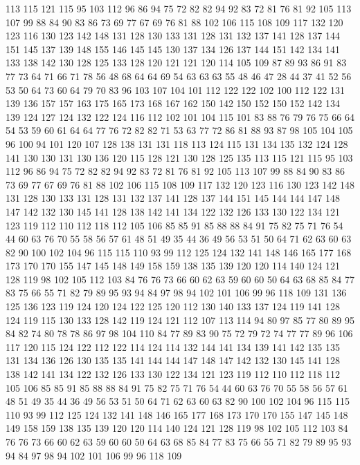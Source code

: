 113 115 121 115 95 103 112 96 86 94 75 72 82 82 94 92 83 72 81 76
81 92 105 113 107 99 88 84 90 83 86 73 69 77 67 69 76 81 88 102
106 115 108 109 117 132 120 123 116 130 123 142 148 131 128 130 133 131 128 131
132 137 141 128 137 144 151 145 137 139 148 155 146 145 145 130 137 134 126 137
144 151 142 134 141 133 138 142 130 128 125 133 128 120 121 121 120 114 105 109
87 89 93 86 91 83 77 73 64 71 66 71 78 56 48 68 64 64 69 54
63 63 63 55 48 46 47 28 44 37 41 52 56 53 50 64 73 60 64 79
70 83 96 103 107 104 101 112 122 122 102 100 112 122 131 139 136 157 157 163
175 165 173 168 167 162 150 142 150 152 150 152 142 134 139 124 127 124 132 122
124 116 112 102 101 104 115 101 83 88 76 79 76 75 66 64 54 53 59 60
61 64 64 77 76 72 82 82 71 53 63 77 72 86 81 88 93 87 98 105
104 105 96 100 94 101 120 107 128 138 131 131 118 113 124 115 131 134 135 132
124 128 141 130 130 131 130 136 120 115 128 121 130 128 125 135 113 115 121 115
95 103 112 96 86 94 75 72 82 82 94 92 83 72 81 76 81 92 105 113
107 99 88 84 90 83 86 73 69 77 67 69 76 81 88 102 106 115 108 109
117 132 120 123 116 130 123 142 148 131 128 130 133 131 128 131 132 137 141 128
137 144 151 145 144 144 147 148 147 142 132 130 145 141 128 138 142 141 134 122
132 126 133 130 122 134 121 123 119 112 110 112 118 112 105 106 85 85 91 85
88 88 84 91 75 82 75 71 76 54 44 60 63 76 70 55 58 56 57 61
48 51 49 35 44 36 49 56 53 51 50 64 71 62 63 60 63 82 90 100
102 104 96 115 115 110 93 99 112 125 124 132 141 148 146 165 177 168 173 170
170 155 147 145 148 149 158 159 138 135 139 120 120 114 140 124 121 128 119 98
102 105 112 103 84 76 76 73 66 60 62 63 59 60 60 50 64 63 68 85
84 77 83 75 66 55 71 82 79 89 95 93 94 84 97 98 94 102 101 106
99 96 118 109 131 136 125 136 123 119 124 120 124 122 125 120 112 130 140 133
137 124 119 141 128 124 119 115 130 133 128 142 119 124 121 112 107 113 114 94
80 97 85 77 80 89 95 84 82 74 80 78 78 86 97 98 104 110 84 77
89 83 90 75 72 79 72 74 77 77 89 96 106 117 120 115 124 122 112 122
114 124 114 132 144 141 134 139 141 142 135 135 131 134 136 126 130 135 135 141
144 144 147 148 147 142 132 130 145 141 128 138 142 141 134 122 132 126 133 130
122 134 121 123 119 112 110 112 118 112 105 106 85 85 91 85 88 88 84 91
75 82 75 71 76 54 44 60 63 76 70 55 58 56 57 61 48 51 49 35
44 36 49 56 53 51 50 64 71 62 63 60 63 82 90 100 102 104 96 115
115 110 93 99 112 125 124 132 141 148 146 165 177 168 173 170 170 155 147 145
148 149 158 159 138 135 139 120 120 114 140 124 121 128 119 98 102 105 112 103
84 76 76 73 66 60 62 63 59 60 60 50 64 63 68 85 84 77 83 75
66 55 71 82 79 89 95 93 94 84 97 98 94 102 101 106 99 96 118 109

